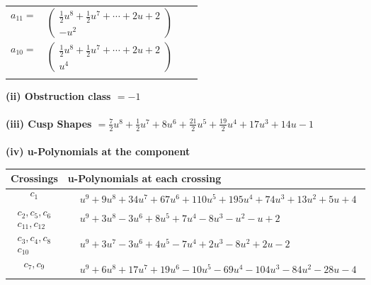 \documentclass[1p]{elsarticle_modified}
\theoremstyle{definition}
\begin{document}
\begin{tabular}{m{7pt} m{180pt} m{7pt} m{180pt} }
\flushright $a_{11}=$&$\begin{pmatrix}\frac{1}{2} u^8+\frac{1}{2} u^7+\cdots+2 u+2\\- u^2\end{pmatrix}$ \\
\flushright $a_{10}=$&$\begin{pmatrix}\frac{1}{2} u^8+\frac{1}{2} u^7+\cdots+2 u+2\\u^4\end{pmatrix}$\\&\end{tabular}
\flushleft \textbf{(ii) Obstruction class $= -1$}\\~\\
\flushleft \textbf{(iii) Cusp Shapes $= \frac{7}{2} u^8+\frac{1}{2} u^7+8 u^6+\frac{21}{2} u^5+\frac{19}{2} u^4+17 u^3+14 u-1$}\\~\\
\newpage\renewcommand{\arraystretch}{1}
\flushleft \textbf{(iv) u-Polynomials at the component}\newline \\
\begin{tabular}{m{50pt}|m{274pt}}
Crossings & \hspace{64pt}u-Polynomials at each crossing \\
\hline $$\begin{aligned}c_{1}\end{aligned}$$&$\begin{aligned}
&u^9+9 u^8+34 u^7+67 u^6+110 u^5+195 u^4+74 u^3+13 u^2+5 u+4
\end{aligned}$\\
\hline $$\begin{aligned}c_{2},c_{5},c_{6}\\c_{11},c_{12}\end{aligned}$$&$\begin{aligned}
&u^9+3 u^8-3 u^6+8 u^5+7 u^4-8 u^3- u^2- u+2
\end{aligned}$\\
\hline $$\begin{aligned}c_{3},c_{4},c_{8}\\c_{10}\end{aligned}$$&$\begin{aligned}
&u^9+3 u^7-3 u^6+4 u^5-7 u^4+2 u^3-8 u^2+2 u-2
\end{aligned}$\\
\hline $$\begin{aligned}c_{7},c_{9}\end{aligned}$$&$\begin{aligned}
&u^9+6 u^8+17 u^7+19 u^6-10 u^5-69 u^4-104 u^3-84 u^2-28 u-4
\end{aligned}$\\
\hline
\end{tabular}\\~\\
\end{document}
